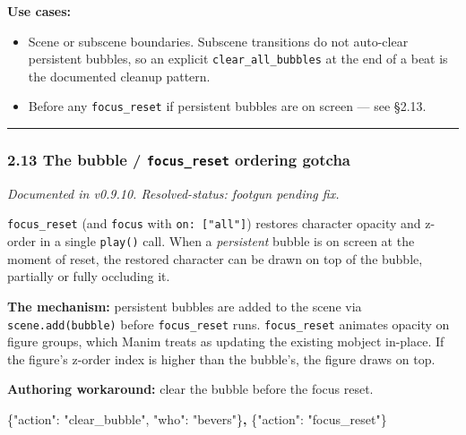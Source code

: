 \documentclass[
  12pt,
  letterpaper,
]{book}
\newenvironment{Shaded}{}{}
\newcommand{\DataTypeTok}[1]{\textcolor[rgb]{0.56,0.13,0.00}{#1}}
\newcommand{\ErrorTok}[1]{\textcolor[rgb]{1.00,0.00,0.00}{\textbf{#1}}}
\newcommand{\FunctionTok}[1]{\textcolor[rgb]{0.02,0.16,0.49}{#1}}
\newcommand{\StringTok}[1]{\textcolor[rgb]{0.25,0.44,0.63}{#1}}
\providecommand{\tightlist}{%
  \setlength{\itemsep}{0pt}\setlength{\parskip}{0pt}}
\begin{document}
\textbf{Use cases:}

\begin{itemize}
\tightlist
\item
  Scene or subscene boundaries. Subscene transitions do not auto-clear
  persistent bubbles, so an explicit \texttt{clear\_all\_bubbles} at the
  end of a beat is the documented cleanup pattern.
\item
  Before any \texttt{focus\_reset} if persistent bubbles are on screen
  --- see §2.13.
\end{itemize}

\begin{center}\rule{0.5\linewidth}{0.5pt}\end{center}

\subsubsection{\texorpdfstring{2.13 The bubble / \texttt{focus\_reset}
ordering
gotcha}{2.13 The bubble / focus\_reset ordering gotcha}}\label{the-bubble-focus_reset-ordering-gotcha}

\emph{Documented in v0.9.10. Resolved-status: footgun pending fix.}

\texttt{focus\_reset} (and \texttt{focus} with
\texttt{on:\ {[}"all"{]}}) restores character opacity and z-order in a
single \texttt{play()} call. When a \emph{persistent} bubble is on
screen at the moment of reset, the restored character can be drawn on
top of the bubble, partially or fully occluding it.

\textbf{The mechanism:} persistent bubbles are added to the scene via
\texttt{scene.add(bubble)} before \texttt{focus\_reset} runs.
\texttt{focus\_reset} animates opacity on figure groups, which Manim
treats as updating the existing mobject in-place. If the figure's
z-order index is higher than the bubble's, the figure draws on top.

\textbf{Authoring workaround:} clear the bubble before the focus reset.

\begin{Shaded}
\begin{Highlighting}[]
\FunctionTok{\{}\DataTypeTok{"action"}\FunctionTok{:} \StringTok{"clear\_bubble"}\FunctionTok{,} \DataTypeTok{"who"}\FunctionTok{:} \StringTok{"bevers"}\FunctionTok{\}}\ErrorTok{,}
\FunctionTok{\{}\DataTypeTok{"action"}\FunctionTok{:} \StringTok{"focus\_reset"}\FunctionTok{\}}
\end{Highlighting}
\end{Shaded}
\end{document}
